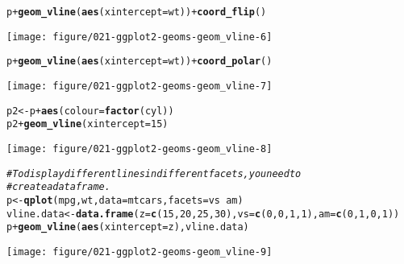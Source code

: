 \documentclass[a4paper,titlepage]{tufte-handout}\usepackage[]{graphicx}\usepackage[]{color}
\makeatletter
\def\maxwidth{ %
  \ifdim\Gin@nat@width>\linewidth
    \linewidth
  \else
    \Gin@nat@width
  \fi
}
\newcommand{\hlnum}[1]{\textcolor[rgb]{0.686,0.059,0.569}{#1}}%
\newcommand{\hlcom}[1]{\textcolor[rgb]{0.678,0.584,0.686}{\textit{#1}}}%
\newcommand{\hlopt}[1]{\textcolor[rgb]{0,0,0}{#1}}%
\newcommand{\hlstd}[1]{\textcolor[rgb]{0.345,0.345,0.345}{#1}}%
\newcommand{\hlkwb}[1]{\textcolor[rgb]{0.69,0.353,0.396}{#1}}%
\newcommand{\hlkwc}[1]{\textcolor[rgb]{0.333,0.667,0.333}{#1}}%
\newcommand{\hlkwd}[1]{\textcolor[rgb]{0.737,0.353,0.396}{\textbf{#1}}}%
\newenvironment{kframe}{%
 \def\at@end@of@kframe{}%
 \ifinner\ifhmode%
  \def\at@end@of@kframe{\end{minipage}}%
  \begin{minipage}{\columnwidth}%
 \fi\fi%
 \def\FrameCommand##1{\hskip\@totalleftmargin \hskip-\fboxsep
 \colorbox{shadecolor}{##1}\hskip-\fboxsep
     \hskip-\linewidth \hskip-\@totalleftmargin \hskip\columnwidth}%
 \MakeFramed {\advance\hsize-\width
   \@totalleftmargin\z@ \linewidth\hsize
   \@setminipage}}%
 {\par\unskip\endMakeFramed%
 \at@end@of@kframe}
\newenvironment{knitrout}{}{} %
\makeatother
\begin{document}
\begin{knitrout}
\begin{kframe}\begin{alltt}
\hlstd{p} \hlopt{+} \hlkwd{geom_vline}\hlstd{(}\hlkwd{aes}\hlstd{(}\hlkwc{xintercept} \hlstd{= wt))} \hlopt{+} \hlkwd{coord_flip}\hlstd{()}
\end{alltt}
\end{kframe}
\texttt{[image: figure/021-ggplot2-geoms-geom\_vline-6]} 
\begin{kframe}\begin{alltt}
\hlstd{p} \hlopt{+} \hlkwd{geom_vline}\hlstd{(}\hlkwd{aes}\hlstd{(}\hlkwc{xintercept} \hlstd{= wt))} \hlopt{+} \hlkwd{coord_polar}\hlstd{()}
\end{alltt}
\end{kframe}
\texttt{[image: figure/021-ggplot2-geoms-geom\_vline-7]} 
\begin{kframe}\begin{alltt}
\hlstd{p2} \hlkwb{<-} \hlstd{p} \hlopt{+} \hlkwd{aes}\hlstd{(}\hlkwc{colour} \hlstd{=} \hlkwd{factor}\hlstd{(cyl))}
\hlstd{p2} \hlopt{+} \hlkwd{geom_vline}\hlstd{(}\hlkwc{xintercept} \hlstd{=} \hlnum{15}\hlstd{)}
\end{alltt}
\end{kframe}
\texttt{[image: figure/021-ggplot2-geoms-geom\_vline-8]} 
\begin{kframe}\begin{alltt}
\hlcom{# To display different lines in different facets, you need to}
\hlcom{# create a data frame.}
\hlstd{p} \hlkwb{<-} \hlkwd{qplot}\hlstd{(mpg, wt,} \hlkwc{data}\hlstd{=mtcars,} \hlkwc{facets} \hlstd{= vs} \hlopt{~} \hlstd{am)}
\hlstd{vline.data} \hlkwb{<-} \hlkwd{data.frame}\hlstd{(}\hlkwc{z} \hlstd{=} \hlkwd{c}\hlstd{(}\hlnum{15}\hlstd{,} \hlnum{20}\hlstd{,} \hlnum{25}\hlstd{,} \hlnum{30}\hlstd{),} \hlkwc{vs} \hlstd{=} \hlkwd{c}\hlstd{(}\hlnum{0}\hlstd{,} \hlnum{0}\hlstd{,} \hlnum{1}\hlstd{,} \hlnum{1}\hlstd{),} \hlkwc{am} \hlstd{=} \hlkwd{c}\hlstd{(}\hlnum{0}\hlstd{,} \hlnum{1}\hlstd{,} \hlnum{0}\hlstd{,} \hlnum{1}\hlstd{))}
\hlstd{p} \hlopt{+} \hlkwd{geom_vline}\hlstd{(}\hlkwd{aes}\hlstd{(}\hlkwc{xintercept} \hlstd{= z), vline.data)}
\end{alltt}
\end{kframe}
\texttt{[image: figure/021-ggplot2-geoms-geom\_vline-9]} 

\end{knitrout}
\end{document}
